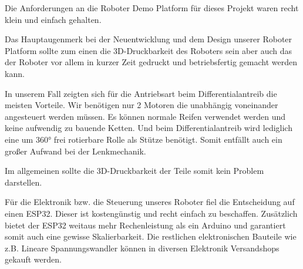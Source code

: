 \begin{flushleft}
    Die Anforderungen an die Roboter Demo Platform für dieses Projekt waren recht klein und einfach gehalten.

    Das Hauptaugenmerk bei der Neuentwicklung und dem Design unserer Roboter Platform sollte zum einen 
    die 3D-Druckbarkeit des Roboters sein aber auch das der Roboter vor allem in kurzer Zeit gedruckt und betriebsfertig gemacht 
    werden kann.

    In unserem Fall zeigten sich für die Antriebsart beim Differentialantreib die meisten Vorteile.
    Wir benötigen nur 2 Motoren die unabhängig voneinander angesteuert werden müssen. Es können normale
    Reifen verwendet werden und keine aufwendig zu bauende Ketten. Und beim Differentialantreib wird lediglich eine
    um 360° frei rotierbare Rolle als Stütze benötigt.
    Somit entfällt auch ein großer Aufwand bei der Lenkmechanik. 

    Im allgemeinen sollte die 3D-Druckbarkeit der Teile somit kein Problem darstellen. 

    Für die Elektronik bzw. die Steuerung unseres Roboter fiel die Entscheidung auf einen ESP32. 
    Dieser ist kostengünstig und recht einfach zu beschaffen. 
    Zusätzlich bietet der ESP32 weitaus mehr Rechenleistung als ein Arduino und garantiert somit auch eine gewisse Skalierbarkeit.
    Die restlichen elektronischen Bauteile wie z.B. Lineare Spannungswandler können in diversen Elektronik Versandshops gekauft werden.
    
\end{flushleft}
